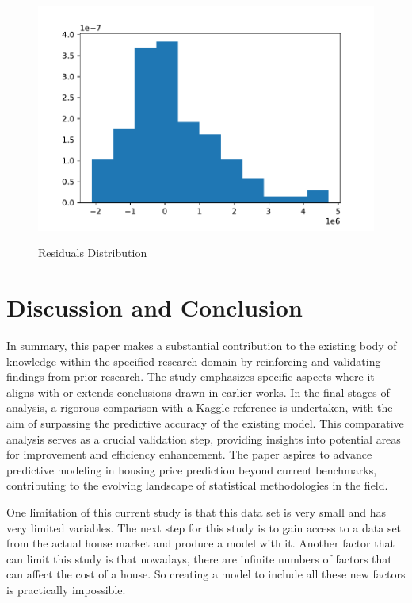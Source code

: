\documentclass[12pt]{article}
\begin{document}
\begin{figure}[h!]
    \caption{Residuals Distribution}
    \includegraphics[width=1\textwidth]{residuals_distribution.pdf}
    \label{fig:residuals_distribution}
\end{figure}

\section{Discussion and Conclusion}
\label{sec:disc}

In summary, this paper makes a substantial contribution to the existing body of knowledge within the specified research domain by reinforcing and validating findings from prior research. The study emphasizes specific aspects where it aligns with or extends conclusions drawn in earlier works. In the final stages of analysis, a rigorous comparison with a Kaggle reference is undertaken, with the aim of surpassing the predictive accuracy of the existing model. This comparative analysis serves as a crucial validation step, providing insights into potential areas for improvement and efficiency enhancement. The paper aspires to advance predictive modeling in housing price prediction beyond current benchmarks, contributing to the evolving landscape of statistical methodologies in the field.

One limitation of this current study is that this data set is very small and has very limited variables. The next step for this study is to gain access to a data set from the actual house market and produce a model with it. Another factor that can limit this study is that nowadays, there are infinite numbers of factors that can affect the cost of a house. So creating a model to include all these new factors is practically impossible. 
\end{document}
